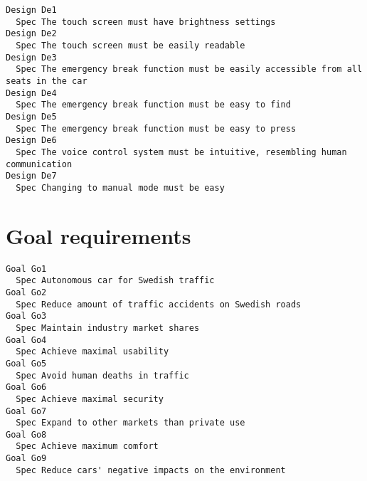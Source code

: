\begin{lstlisting}
Design De1
  Spec The touch screen must have brightness settings
Design De2
  Spec The touch screen must be easily readable
Design De3
  Spec The emergency break function must be easily accessible from all seats in the car
Design De4
  Spec The emergency break function must be easy to find
Design De5
  Spec The emergency break function must be easy to press
Design De6
  Spec The voice control system must be intuitive, resembling human communication
Design De7
  Spec Changing to manual mode must be easy

\end{lstlisting}
    
        
       \section{Goal requirements}


\begin{lstlisting}
Goal Go1
  Spec Autonomous car for Swedish traffic
Goal Go2
  Spec Reduce amount of traffic accidents on Swedish roads
Goal Go3
  Spec Maintain industry market shares
Goal Go4
  Spec Achieve maximal usability
Goal Go5
  Spec Avoid human deaths in traffic
Goal Go6
  Spec Achieve maximal security
Goal Go7
  Spec Expand to other markets than private use
Goal Go8
  Spec Achieve maximum comfort
Goal Go9
  Spec Reduce cars' negative impacts on the environment

\end{lstlisting}